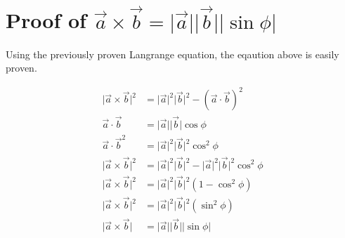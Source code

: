 \section{Proof of $\vec{a}\times\vec{b} = \lvert\vec{a}\rvert\lvert\vec{b}\rvert\lvert\sin\phi\rvert$}

Using the previously proven Langrange equation, the eqaution above is easily proven.

\[
\begin{aligned}
    \lvert\vec{a}\times\vec{b}\rvert^2 & = \lvert\vec{a}\rvert^2\lvert\vec{b}\rvert^2- (\vec{a}\cdot\vec{b})^2 \\
    \vec{a}\cdot\vec{b} & = \lvert\vec{a}\rvert\lvert\vec{b}\rvert\cos\phi \\
    \vec{a}\cdot\vec{b}^2 & = \lvert\vec{a}\rvert^2\lvert\vec{b}\rvert^2\cos^2\phi \\
    \lvert\vec{a}\times\vec{b}\rvert^2 & = \lvert\vec{a}\rvert^2\lvert\vec{b}\rvert^2 - 
        \lvert\vec{a}\rvert^2\lvert\vec{b}\rvert^2\cos^2\phi\\
    \lvert\vec{a}\times\vec{b}\rvert^2 & = \lvert\vec{a}\rvert^2\lvert\vec{b}\rvert^2(1-\cos^2\phi) \\
    \lvert\vec{a}\times\vec{b}\rvert^2 & = \lvert\vec{a}\rvert^2\lvert\vec{b}\rvert^2(\sin^2\phi) \\
    \lvert\vec{a}\times\vec{b}\rvert & = \lvert\vec{a}\rvert\lvert\vec{b}\rvert \lvert\sin\phi\rvert \\
\end{aligned}
\]